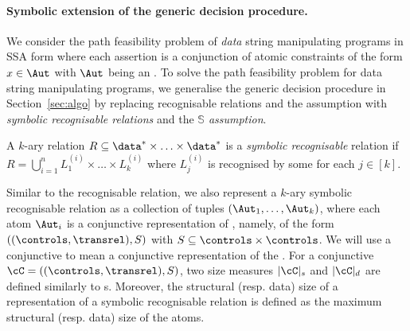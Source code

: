

\paragraph{Symbolic extension of the generic decision procedure.} We consider the path feasibility problem of \emph{data} string manipulating programs in SSA form 
 where each assertion is a conjunction of atomic constraints of the form $x \in \Aut$ with $\Aut$ being an \SA. 
To solve the path feasibility problem for data string manipulating programs,
we generalise the generic decision procedure in Section~\ref{sec:algo} by replacing recognisable relations and the \prerec{} assumption with \emph{symbolic recognisable relations} and the \emph{$\mathbb{S}$\prerec{} assumption}.

\begin{definition}[Symbolic recognisable relations]
	A $k$-ary relation $R \subseteq \data^*\times \ldots\times \data^*$ is a \emph{symbolic recognisable} relation if $R=\bigcup_{i=1}^n L^{(i)}_1 \times \ldots \times L^{(i)}_k$ where $L^{(i)}_j$ is recognised by some \SA{} for each $j\in [k]$.
\end{definition}
Similar to the recognisable relation, we also represent a  $k$-ary symbolic recognisable relation as a collection of tuples $(\Aut_1, \ldots, \Aut_k)$, where each atom $\Aut_i$ is a conjunctive representation of \SA{}, namely, of the form $((\controls, \transrel), S)$ with $S \subseteq \controls \times \controls$. We will use a conjunctive \SA{} to mean a conjunctive representation of the \SA{}. For a conjunctive \SA{} $\cC= ((\controls, \transrel), S)$, two size measures $|\cC|_s$ and $|\cC|_d$ are defined similarly to \SA{}s. Moreover, the structural (resp. data) size of a representation of a symbolic recognisable relation is defined as the maximum structural (resp. data) size of the atoms.

